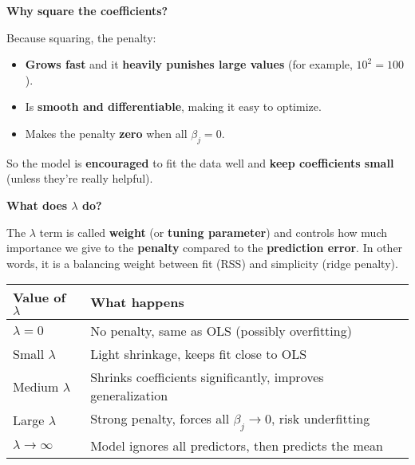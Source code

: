 \begin{flushleft}
    \textcolor{Green3}{ \textbf{Why square the coefficients?}}
\end{flushleft}
Because squaring, the penalty:
\begin{itemize}
    \item \textbf{Grows fast} and it \textbf{heavily punishes large values} (for example, $10^2 = 100$).
    \item Is \textbf{smooth and differentiable}, making it easy to optimize.
    \item Makes the penalty \textbf{zero} when all $\beta_j = 0$.
\end{itemize}
So the model is \textbf{encouraged} to fit the data well and \textbf{keep coefficients small} (unless they're really helpful).

\highspace
\begin{flushleft}
    \textcolor{Green3}{ \textbf{What does $\lambda$ do?}}
\end{flushleft}
The $\lambda$ term is called \textbf{weight} (or \textbf{tuning parameter}) and controls how much importance we give to the \textbf{penalty} compared to the \textbf{prediction error}. In other words, it is a balancing weight between fit (RSS) and simplicity (ridge penalty).

\begin{table}[!htp]
    \centering
    \begin{tabular}{@{} l l @{}}
        \toprule
        Value of $\lambda$      & What happens \\
        \midrule
        $\lambda = 0$           & No penalty, same as OLS (possibly overfitting)                \\ [.3em]
        Small $\lambda$         & Light shrinkage, keeps fit close to OLS                       \\ [.3em]
        Medium $\lambda$        & Shrinks coefficients significantly, improves generalization   \\ [.3em]
        Large $\lambda$         & Strong penalty, forces all $\beta_j \to 0$, risk underfitting \\ [.3em]
        $\lambda \to \infty$    & Model ignores all predictors, then predicts the mean          \\
        \bottomrule
    \end{tabular}
\end{table}

\newpage

